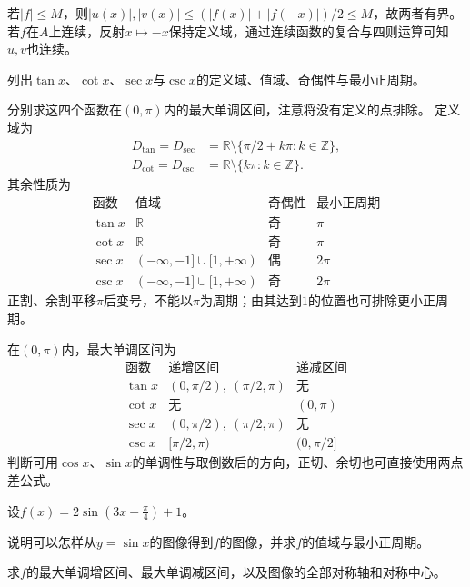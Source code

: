 若\(|f|\le M\)，则\(|u(x)|,|v(x)|\le(|f(x)|+|f(-x)|)/2\le M\)，故两者有界。若\(f\)在\(A\)上连续，反射\(x\mapsto-x\)保持定义域，通过连续函数的复合与四则运算可知\(u,v\)也连续。


列出\(\tan x\)、\(\cot x\)、\(\sec x\)与\(\csc x\)的定义域、值域、奇偶性与最小正周期。

分别求这四个函数在\((0 , \pi)\)内的最大单调区间，注意将没有定义的点排除。
\solutionanswer
定义域为
\[
\begin{aligned}
D_{\tan}=D_{\sec}&=\mathbb R\setminus\{\pi/2+k\pi:k\in\mathbb Z\},\\
D_{\cot}=D_{\csc}&=\mathbb R\setminus\{k\pi:k\in\mathbb Z\}.
\end{aligned}
\]
其余性质为
\[
\begin{array}{c|c|c|c}
\text{函数}&\text{值域}&\text{奇偶性}&\text{最小正周期}\\\hline
\tan x&\mathbb R&\text{奇}&\pi\\
\cot x&\mathbb R&\text{奇}&\pi\\
\sec x&(-\infty,-1]\cup[1,+\infty)&\text{偶}&2\pi\\
\csc x&(-\infty,-1]\cup[1,+\infty)&\text{奇}&2\pi
\end{array}
\]
正割、余割平移\(\pi\)后变号，不能以\(\pi\)为周期；由其达到\(1\)的位置也可排除更小正周期。

在\((0,\pi)\)内，最大单调区间为
\[
\begin{array}{c|c|c}
\text{函数}&\text{递增区间}&\text{递减区间}\\\hline
\tan x&(0,\pi/2),\ (\pi/2,\pi)&\text{无}\\
\cot x&\text{无}&(0,\pi)\\
\sec x&(0,\pi/2),\ (\pi/2,\pi)&\text{无}\\
\csc x&[\pi/2,\pi)&(0,\pi/2]
\end{array}
\]
判断可用\(\cos x\)、\(\sin x\)的单调性与取倒数后的方向，正切、余切也可直接使用两点差公式。


设\(f(x) = 2 \sin \left( 3 x - \frac{\pi}{4} \right) + 1\)。

\quad {}说明可以怎样从\(y = \sin x\)的图像得到\(f\)的图像，并求\(f\)的值域与最小正周期。

\quad {}求\(f\)的最大单调增区间、最大单调减区间，以及图像的全部对称轴和对称中心。

